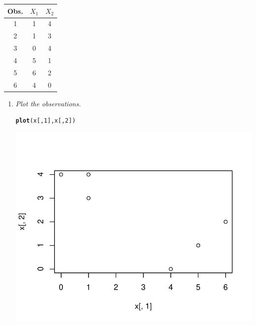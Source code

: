 \documentclass[11pt]{article}\usepackage[]{graphicx}\usepackage[]{color}
\makeatletter
\def\maxwidth{ %
  \ifdim\Gin@nat@width>\linewidth
    \linewidth
  \else
    \Gin@nat@width
  \fi
}
\newcommand{\hlnum}[1]{\textcolor[rgb]{0.686,0.059,0.569}{#1}}%
\newcommand{\hlstd}[1]{\textcolor[rgb]{0.345,0.345,0.345}{#1}}%
\newcommand{\hlkwd}[1]{\textcolor[rgb]{0.737,0.353,0.396}{\textbf{#1}}}%
\newenvironment{kframe}{%
 \def\at@end@of@kframe{}%
 \ifinner\ifhmode%
  \def\at@end@of@kframe{\end{minipage}}%
  \begin{minipage}{\columnwidth}%
 \fi\fi%
 \def\FrameCommand##1{\hskip\@totalleftmargin \hskip-\fboxsep
 \colorbox{shadecolor}{##1}\hskip-\fboxsep
     \hskip-\linewidth \hskip-\@totalleftmargin \hskip\columnwidth}%
 \MakeFramed {\advance\hsize-\width
   \@totalleftmargin\z@ \linewidth\hsize
   \@setminipage}}%
 {\par\unskip\endMakeFramed%
 \at@end@of@kframe}
\newenvironment{knitrout}{}{} %
\makeatother
\begin{document}
\begin{enumerate}
    		\begin{table}[h]
                \centering
                \begin{tabular}{c|cc} \hline
                Obs. & $X_1$ & $X_2$ \\ \hline
                1    & 1     & 4     \\
                2    & 1     & 3     \\
                3    & 0     & 4     \\
                4    & 5     & 1     \\
                5    & 6     & 2     \\
                6    & 4     & 0    \\ \hline
                \end{tabular}
            \end{table}
            


            \begin{enumerate}
				\item \textit{Plot the observations.}
			
\begin{knitrout}
\color{fgcolor}\begin{kframe}
\begin{alltt}
\hlkwd{plot}\hlstd{(x[,}\hlnum{1}\hlstd{], x[,}\hlnum{2}\hlstd{])}
\end{alltt}
\end{kframe}

{\centering \includegraphics[width=\maxwidth]{figure/unnamed-chunk-2-1} 

}
\end{knitrout}
\end{enumerate}
\end{enumerate}
\end{document}
